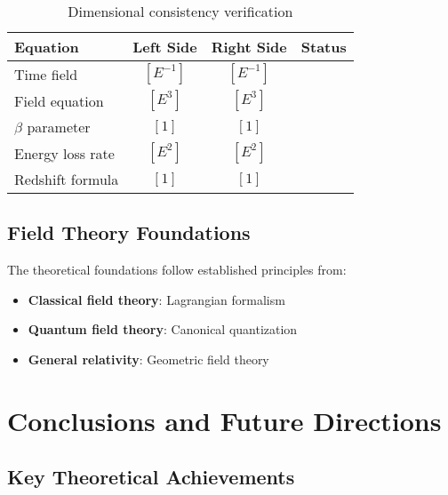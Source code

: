 \documentclass[12pt,a4paper]{article}
\begin{document}
	\begin{table}[htbp]
		\centering
		\begin{tabular}{lccl}
			\toprule
			\textbf{Equation} & \textbf{Left Side} & \textbf{Right Side} & \textbf{Status} \\
			\midrule
			Time field & $[E^{-1}]$ & $[E^{-1}]$ & \checkmark \\
			Field equation & $[E^3]$ & $[E^3]$ & \checkmark \\
			$\beta$ parameter & $[1]$ & $[1]$ & \checkmark \\
			Energy loss rate & $[E^2]$ & $[E^2]$ & \checkmark \\
			Redshift formula & $[1]$ & $[1]$ & \checkmark \\
			\bottomrule
		\end{tabular}
		\caption{Dimensional consistency verification}
		\label{tab:dimensional_check}
	\end{table}
	
	\subsection{Field Theory Foundations}
	\label{subsec:field_theory_foundations}
	
	The theoretical foundations follow established principles from:
	\begin{itemize}
		\item \textbf{Classical field theory}: Lagrangian formalism \citep{goldstein2001,landau1975}
		\item \textbf{Quantum field theory}: Canonical quantization \citep{peskin1995,weinberg1995}
		\item \textbf{General relativity}: Geometric field theory \citep{misner1973,carroll2004}
	\end{itemize}
	
	\section{Conclusions and Future Directions}
	\label{sec:conclusions}
	
	\subsection{Key Theoretical Achievements}
	\label{subsec:key_achievements}
	
\end{document}
